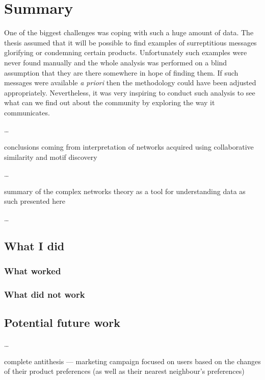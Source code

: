 \chapter{Summary}

  One of the biggest challenges was coping with such a huge amount of data. The thesis assumed that it will be possible to find examples of surreptitious messages glorifying or condemning certain products. Unfortunately such examples were never found manually and the whole analysis was performed on a blind assumption that they are there somewhere in hope of finding them. If such messages were available \emph{a priori} then the methodology could have been adjusted appropriately.  Nevertheless, it was very inspiring to conduct such analysis to see what can we find out about the community by exploring the way it communicates.
  
  \ldots
  
  conclusions coming from interpretation of networks acquired using collaborative similarity and motif discovery
  
  \ldots
  
  summary of the complex networks theory as a tool for understanding data as such presented here
  
  \ldots


  \section{What I did}

    \subsection{What worked}

	\subsection{What did not work}

    \section{Potential future work}
    
      \ldots
      
      complete antithesis --- marketing campaign focused on users based on the changes of their product preferences (as well as their nearest neighbour's preferences)
      
